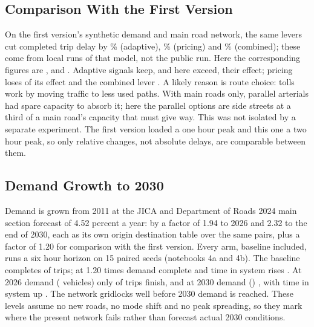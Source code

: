 \subsection{Comparison With the First Version}\label{sec:v1}
On the first version's synthetic demand and main road network, the same levers cut completed trip
delay by \OldAdaptive\% (adaptive), \OldPricing\% (pricing) and \OldComb\% (combined); these come
from local runs of that model, not the public run. Here the corresponding figures are
\HOneDelay, \HTwoDelay{} and \HThreeDelay. Adaptive signals keep, and here exceed, their effect;
pricing loses \OldPricingLoss{} of its effect and the combined lever \OldCombLoss. A likely reason is
route choice: tolls work by moving traffic to less used paths. With main roads only, parallel
arterials had spare capacity to absorb it; here the parallel options are side streets at a third
of a main road's capacity that must give way. This was not isolated by a separate experiment. The
first version loaded a one hour peak and this one a two hour peak, so only relative changes, not
absolute delays, are comparable between them.

\subsection{Demand Growth to 2030}
Demand is grown from 2011 at the JICA and Department of Roads 2024 main section forecast of 4.52
percent a year: by a factor of 1.94 to 2026 and 2.32 to the end of 2030, each as its own origin
destination table over the same pairs, plus a factor of 1.20 for comparison with the first
version. Every arm, baseline included, runs a six hour horizon on 15 paired seeds (notebooks 4a and
4b). The baseline completes \ProjBaseComp{} of trips; at 1.20 times demand \ProjFourComp{} complete
and time in system rises \ProjFourTis. At 2026 demand (\ProjTwentySixVeh{} vehicles) only
\ProjTwentySixComp{} of trips finish, and at 2030 demand (\ProjThirtyVeh) \ProjThirtyComp, with
time in system up \ProjThirtyTis. The network gridlocks well before 2030 demand is reached. These
levels assume no new roads, no mode shift and no peak spreading, so they mark where the present
network fails rather than forecast actual 2030 conditions.
